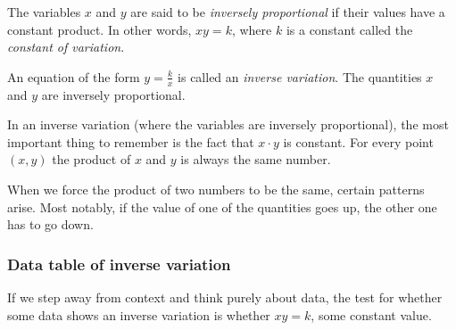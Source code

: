 \begin{boxdef}
The variables $x$ and $y$ are said to be \textit{inversely proportional} if their values have a constant product. In other words, $xy = k$, where $k$ is a constant called the \textit{constant of variation}.

An equation of the form $y = \frac{k}{x}$ is called an \textit{inverse variation}. The quantities $x$ and $y$ are inversely proportional.
\end{boxdef}

In an inverse variation (where the variables are inversely proportional), the most important thing to remember is the fact that $x \cdot y$ is constant. For every point $(x, y)$ the product of $x$ and $y$ is always the same number.

When we force the product of two numbers to be the same, certain patterns arise. Most notably, if the value of one of the quantities goes up, the other one has to go down.

%

\subsubsection{Data table of inverse variation}

If we step away from context and think purely about data, the test for whether some data shows an inverse variation is whether $xy = k$, some constant value.

